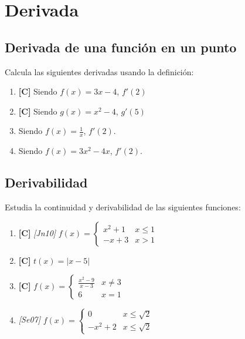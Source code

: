 \chapter{Derivada}
\setcounter{exercicio}{0}

\section{Derivada de una función en un punto}

\Exercicio Calcula las siguientes derivadas usando la definición:

\begin{enumerate}[topsep=0pt]
	\item \textbf{[C]} Siendo $f(x) = 3x - 4$, $f'(2)$
	\item \textbf{[C]} Siendo $g(x) = x^2 - 4$, $g'(5)$
	\item Siendo $f(x) = \frac{1}{x}$, $f'(2)$.
	\item Siendo $f(x) = 3x^2-4x$, $f'(2)$.
\end{enumerate}

\section{Derivabilidad}

\Exercicio Estudia la continuidad y derivabilidad de las siguientes funciones:
\begin{enumerate}[topsep=0pt]
	\item \textbf{[C]} \textit{[Jn10]} $ f(x) = \left\{ \begin{array}{lc}
						x^2+1 & x \leq 1 \\
						-x+3  & x > 1
						\end{array}
						\right.$
	\item \textbf{[C]} $ t(x) = |x-5| $
	\item \textbf{[C]} $ f(x) = \left\{ \begin{array}{lc}
						\frac{x^2-9}{x-3} & x \neq 3 \\
						6                 & x = 1
						\end{array}
						\right.$
	\item \textit{[Se07]} $ f(x) = \left\{ \begin{array}{lc}
			0 & x \leq \sqrt{2} \\
			-x^2+2 & x \leq \sqrt{2}
			\end{array}
			\right.$
\end{enumerate}


